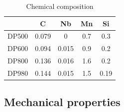 \documentclass{article}
\begin{document}
\begin{center}
\begin{table}[]
    \centering
    \begin{tabular}{c|cccc}
    \hline
         & C & Nb & Mn & Si  \\ [0.5ex]
         \hline
         \rowcolor{Gray}
         DP500 & 0.079 & 0 & 0.7& 0.3 \\
         
         DP600 &0.094 & 0.015 & 0.9& 0.2 \\
         \rowcolor{Gray}
         DP800 &0.136 &0.016 & 1.6&0.2 \\
         
         DP980 &0.144 &0.015 &1.5 &0.19 \\
         \hline
    \end{tabular}
    \caption{Chemical composition}
    \label{tab:ChemicalComp}
\end{table}
\end{center}



\subsection{Mechanical properties}
\end{document}
